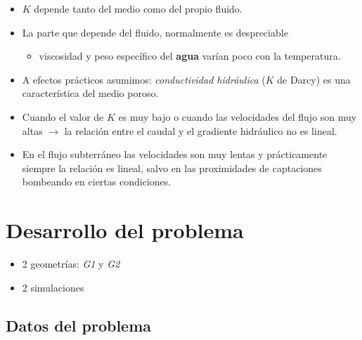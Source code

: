 \documentclass[spanish]{beamer}
\begin{document}
%
\begin{frame}
\begin{itemize}
\item $K$ depende tanto del medio como del propio fluido.
\item La parte que depende del fluido, normalmente es despreciable
	\begin{itemize} 
		\item viscosidad y peso específico del \textbf{agua} varían poco con la temperatura.
	\end{itemize}
\item A efectos prácticos asumimos: \emph{conductividad hidráulica} ($K$ de Darcy) es una característica del medio poroso.
\item Cuando el valor de $K$ es muy bajo o cuando las velocidades del flujo son muy altas $\rightarrow$ la relación entre el caudal y el gradiente hidráulico no es lineal.
\item En el flujo subterráneo las velocidades son muy lentas y prácticamente siempre la relación es lineal, salvo en las proximidades de captaciones bombeando en ciertas condiciones.
\end{itemize}
\end{frame}
\section{Desarrollo del problema}
%
\begin{frame}
\begin{itemize}
\item 2 geometrías: \emph{G1} y \emph{G2}
\item 2 simulaciones
\end{itemize}
\end{frame}
%
\subsection{Datos del problema}
\end{document}
